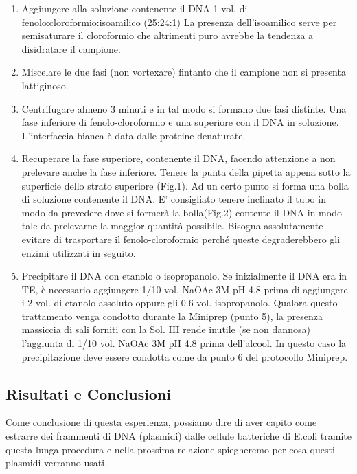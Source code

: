 \begin{enumerate}
  \item Aggiungere alla soluzione contenente il DNA 1 vol. di fenolo:cloroformio:isoamilico (25:24:1)
	La presenza dell’isoamilico serve per semisaturare il cloroformio che altrimenti puro avrebbe la
	tendenza a disidratare il campione.

  \item Miscelare le due fasi (non vortexare) fintanto che il campione non si presenta lattiginoso.

  \item Centrifugare almeno 3 minuti e in tal modo si formano due fasi distinte.
	Una fase inferiore di fenolo-cloroformio e una superiore con il DNA in soluzione.
	L’interfaccia bianca è data dalle proteine denaturate.

  \item Recuperare la fase superiore, contenente il DNA, facendo attenzione a non
	prelevare anche la fase inferiore. Tenere la punta della pipetta appena sotto la superficie
	dello strato superiore (Fig.1). Ad un certo punto si forma una bolla di soluzione contenente il DNA.
	E’ consigliato tenere inclinato il tubo in modo da prevedere dove si formerà la bolla(Fig.2) contente il DNA in modo
	tale da prelevarne la maggior quantità possibile. Bisogna assolutamente evitare di trasportare il fenolo-cloroformio
	perché queste degraderebbero gli enzimi utilizzati in seguito.

  \item Precipitare il DNA con etanolo o isopropanolo. Se inizialmente il DNA era in TE, è necessario aggiungere 1/10 vol.
	NaOAc 3M pH 4.8 prima di aggiungere i 2 vol. di etanolo assoluto oppure gli 0.6 vol. isopropanolo.
	Qualora questo trattamento venga condotto durante la Miniprep (punto 5), la presenza massiccia di sali forniti con
	la Sol. III  rende inutile (se non dannosa) l’aggiunta di 1/10 vol. NaOAc 3M pH 4.8 prima dell’alcool.
	In questo caso la precipitazione deve essere condotta come da punto 6 del protocollo Miniprep.


\end{enumerate}

\subsection{Risultati e Conclusioni}

Come conclusione di questa esperienza, possiamo dire di aver capito come estrarre dei frammenti di DNA (plasmidi)
dalle cellule batteriche di E.coli tramite questa lunga procedura e nella prossima relazione spiegheremo per cosa
questi plasmidi verranno usati.
